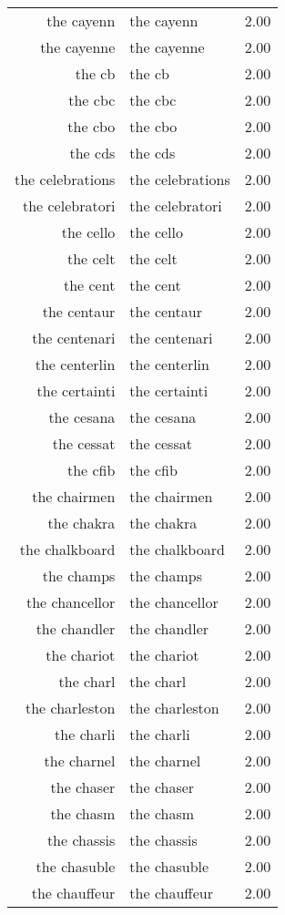 \begin{table}[ht]
\begin{tabular}{rlr}
  the cayenn & the cayenn & 2.00 \\ 
  the cayenne & the cayenne & 2.00 \\ 
  the cb & the cb & 2.00 \\ 
  the cbc & the cbc & 2.00 \\ 
  the cbo & the cbo & 2.00 \\ 
  the cds & the cds & 2.00 \\ 
  the celebrations & the celebrations & 2.00 \\ 
  the celebratori & the celebratori & 2.00 \\ 
  the cello & the cello & 2.00 \\ 
  the celt & the celt & 2.00 \\ 
  the cent & the cent & 2.00 \\ 
  the centaur & the centaur & 2.00 \\ 
  the centenari & the centenari & 2.00 \\ 
  the centerlin & the centerlin & 2.00 \\ 
  the certainti & the certainti & 2.00 \\ 
  the cesana & the cesana & 2.00 \\ 
  the cessat & the cessat & 2.00 \\ 
  the cfib & the cfib & 2.00 \\ 
  the chairmen & the chairmen & 2.00 \\ 
  the chakra & the chakra & 2.00 \\ 
  the chalkboard & the chalkboard & 2.00 \\ 
  the champs & the champs & 2.00 \\ 
  the chancellor & the chancellor & 2.00 \\ 
  the chandler & the chandler & 2.00 \\ 
  the chariot & the chariot & 2.00 \\ 
  the charl & the charl & 2.00 \\ 
  the charleston & the charleston & 2.00 \\ 
  the charli & the charli & 2.00 \\ 
  the charnel & the charnel & 2.00 \\ 
  the chaser & the chaser & 2.00 \\ 
  the chasm & the chasm & 2.00 \\ 
  the chassis & the chassis & 2.00 \\ 
  the chasuble & the chasuble & 2.00 \\ 
  the chauffeur & the chauffeur & 2.00 \\ 

\end{tabular}
\end{table}
